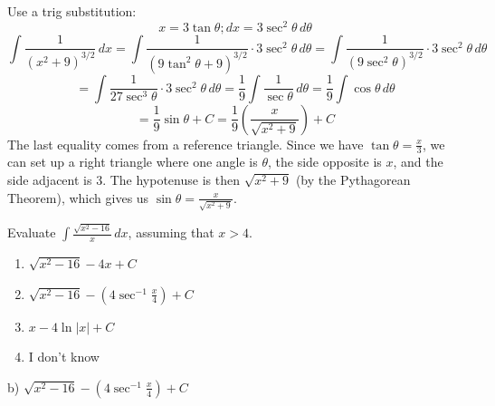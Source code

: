 \documentclass[addpoints,12pt,answers]{exam}
\begin{document}
\begin{questions}
\begin{solution}
    Use a trig substitution:    
    $$x=3\tan\theta; dx=3\sec^2\theta\,d\theta$$
    $$\int\frac{1}{(x^2+9)^{3/2}}\,dx=\int\frac{1}{(9\tan^2\theta+9)^{3/2}}\cdot 3\sec^2\theta\,d\theta=\int\frac{1}{(9\sec^2\theta)^{3/2}}\cdot 3\sec^2\theta\,d\theta$$
    $$=\int\frac{1}{27\sec^3\theta}\cdot 3\sec^2\theta\,d\theta=\frac{1}{9}\int\frac{1}{\sec\theta}\,d\theta=\frac{1}{9}\int\cos\theta\,d\theta$$
    $$=\frac{1}{9}\sin\theta+C=\frac{1}{9}\left(\frac{x}{\sqrt{x^2+9}}\right)+C$$
    The last equality comes from a reference triangle. Since we have $\displaystyle\tan\theta=\frac{x}{3}$, we can set up a right triangle where one angle is $\theta$, the side opposite is $x$, and the side adjacent is 3. The hypotenuse is then $\sqrt{x^2+9}$ (by the Pythagorean Theorem), which gives us $\displaystyle\sin\theta=\frac{x}{\sqrt{x^2+9}}$.
    \begin{center}
    \end{center}
  \end{solution}
  \newpage
  \question
  Evaluate $\displaystyle\int\frac{\sqrt{x^2-16}}{x}\,dx$, assuming that $x>4$.
  \begin{enumerate}[label=\alph*)]
    \item
    $\displaystyle\sqrt{x^2-16}-4x+C$
    \item
    $\displaystyle\sqrt{x^2-16}-\left(4\sec^{-1}\frac{x}{4}\right)+C$
    \item
    $\displaystyle x-4\ln|x|+C$
    \item
    I don't know
  \end{enumerate}
  \begin{solution}
    b) $\displaystyle\sqrt{x^2-16}-\left(4\sec^{-1}\frac{x}{4}\right)+C$
    

\end{solution}
\end{questions}
\end{document}
